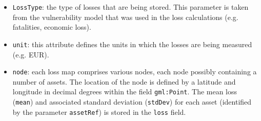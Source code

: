 \begin{itemize}

  \item \Verb+LossType+: the type of losses that are being stored. This
    parameter is taken from the \gls{vulnerability model} that was used in the
    loss calculations (e.g. fatalities, economic loss).

  \item \Verb+unit+: this attribute defines the units in which the losses are
    being measured (e.g. EUR).

  \item \Verb+node+: each loss map comprises various nodes, each node possibly
    containing a number of \glspl{asset}. The location of the node is defined
    by a latitude and longitude in decimal degrees within the field
    \Verb+gml:Point+. The mean loss (\Verb+mean+) and associated standard
    deviation (\Verb+stdDev+) for each \gls{asset} (identified by the parameter
    \Verb+assetRef+) is stored in the \Verb+loss+ field.

\end{itemize}